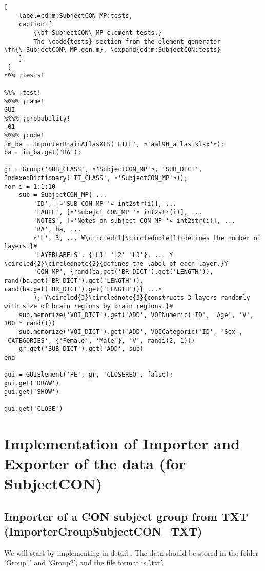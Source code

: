 \documentclass{tufte-handout}
\begin{document}
\begin{lstlisting}[
	label=cd:m:SubjectCON_MP:tests,
	caption={
		{\bf SubjectCON\_MP element tests.}
		The \code{tests} section from the element generator \fn{\_SubjectCON\_MP.gen.m}. \expand{cd:m:SubjectCON:tests}
	}
 ]
¤%% ¡tests!

%%% ¡test!
%%%% ¡name!
GUI
%%%% ¡probability!
.01
%%%% ¡code!
im_ba = ImporterBrainAtlasXLS('FILE', ¤'aal90_atlas.xlsx'¤);
ba = im_ba.get('BA');

gr = Group('SUB_CLASS', ¤'SubjectCON_MP'¤, 'SUB_DICT', IndexedDictionary('IT_CLASS', ¤'SubjectCON_MP'¤));
for i = 1:1:10 
    sub = SubjectCON_MP( ...
        'ID', [¤'SUB CON_MP '¤ int2str(i)], ...
        'LABEL', [¤'Subejct CON_MP '¤ int2str(i)], ...
        'NOTES', [¤'Notes on subject CON_MP '¤ int2str(i)], ...
        'BA', ba, ...
        ¤'L', 3, ... ¥\circled{1}\circlednote{1}{defines the number of layers.}¥
        'LAYERLABELS', {'L1' 'L2' 'L3'}, ... ¥\circled{2}\circlednote{2}{defines the label of each layer.}¥
        'CON_MP', {rand(ba.get('BR_DICT').get('LENGTH')), rand(ba.get('BR_DICT').get('LENGTH')), rand(ba.get('BR_DICT').get('LENGTH'))} ...¤
        ); ¥\circled{3}\circlednote{3}{constructs 3 layers randomly with size of brain regions by brain regions.}¥
    sub.memorize('VOI_DICT').get('ADD', VOINumeric('ID', 'Age', 'V', 100 * rand()))
    sub.memorize('VOI_DICT').get('ADD', VOICategoric('ID', 'Sex', 'CATEGORIES', {'Female', 'Male'}, 'V', randi(2, 1)))
    gr.get('SUB_DICT').get('ADD', sub)
end

gui = GUIElement('PE', gr, 'CLOSEREQ', false);
gui.get('DRAW')
gui.get('SHOW')

gui.get('CLOSE')
\end{lstlisting}

\clearpage
\section{Implementation of Importer and Exporter of the data (for SubjectCON)}

\subsection{Importer of a CON subject group from TXT (ImporterGroupSubjectCON\_TXT)}

We will start by implementing in detail . The data should be stored in the folder 'Group1' and 'Group2', and the file format is '.txt'.
\end{document}
